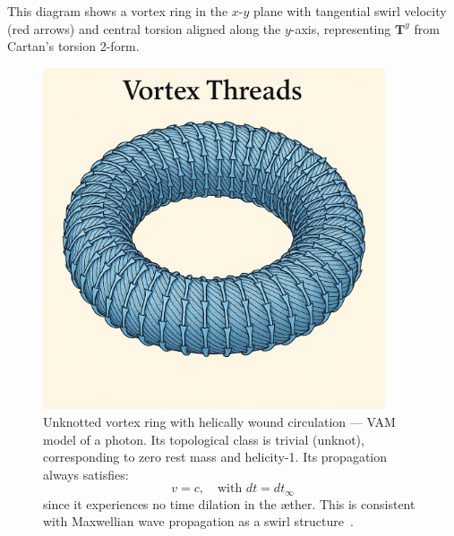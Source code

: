 \noindent
This diagram shows a vortex ring in the $x$-$y$ plane with tangential swirl velocity (red arrows) and central torsion aligned along the $y$-axis,
representing $\mathbf{T}^y$ from Cartan's torsion 2-form.

\begin{figure}[H]
    \centering
    \includegraphics[width=0.9\textwidth]{figures/Un-Knot}
    \caption{Unknotted vortex ring with helically wound circulation — VAM model of a photon. Its topological class is trivial (unknot), corresponding to zero rest mass and helicity-1. Its propagation always satisfies:
        \[
            v = c, \quad \text{with } dt = dt_{\infty}
        \]
        since it experiences no time dilation in the æther. This is consistent with Maxwellian wave propagation as a swirl structure~\cite{maxwell1875}.}
    \label{fig:un-knot}
\end{figure}

